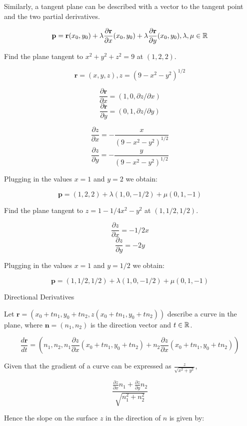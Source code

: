 \documentclass[a4paper,10pt]{article}
\begin{document}
Similarly, a tangent plane can be described with a vector to the tangent point
and the two partial derivatives.

\[ \mathbf{p} = \mathbf{r}(x_0, y_0)
+ \lambda \frac{\partial \mathbf{r}}{\partial x}(x_0, y_0)
+ \lambda \frac{\partial \mathbf{r}}{\partial y}(x_0, y_0)
, \lambda, \mu \in \mathbb{R} \]

\begin{ex}
	Find the plane tangent to $x^2 + y^2 + z^2 = 9$ at $(1,2,2)$.

	\[ \mathbf{r} = (x,y,z), z = (9 - x^2 - y^2)^{1/2} \]

	\[ \frac{\partial \mathbf{r}}{\partial x} = (1, 0, \partial z /
	\partial x) \]
	\[ \frac{\partial \mathbf{r}}{\partial y} = (0, 1, \partial z /
	\partial y) \]

	\[ \frac{\partial z}{\partial x} = - \frac{x}{(9-x^2-y^2)^{1/2}} \]
	\[ \frac{\partial z}{\partial y} = - \frac{y}{(9-x^2-y^2)^{1/2}} \]

	Plugging in the values $x=1$ and $y=2$ we obtain:

	\[ \mathbf{p} = (1,2,2) + \lambda (1, 0, -1/2) + \mu (0, 1, -1) \]
\end{ex}

\begin{ex}
	Find the plane tangent to $z = 1 - 1/4 x^2 - y^2$ at $(1,1/2,1/2)$.

	\[ \frac{\partial z}{\partial x} = -1/2 x \]
	\[ \frac{\partial z}{\partial y} = -2y \]

	Plugging in the values $x=1$ and $y=1/2$ we obtain:

	\[ \mathbf{p} = (1,1/2,1/2) + \lambda (1, 0, -1/2) + \mu (0, 1, -1) \]
\end{ex}

Directional Derivatives

Let $\mathbf{r} = \left(x_0 + tn_1, y_0 + tn_2, z(x_0 + tn_1, y_0 +
tn_2)\right)$ describe a curve in the plane, where $\mathbf{n} = (n_1, n_2)$ is
the direction vector and $t \in \mathbb{R}$.

\[ \frac{d\mathbf{r}}{dt} = \left(n_1, n_2, n_1 \frac{\partial z}{\partial x}
(x_0 + tn_1, y_0 + tn_2) + n_2 \frac{\partial z}{\partial x} (x_0 + tn_1, y_0 +
tn_2)\right) \]

Given that the gradient of a curve can be expressed as $\frac{z}{\sqrt{x^2 +
y^2}}$,

\[ \frac{\frac{\partial z}{\partial x} n_1 + \frac{\partial z}{\partial y}
n_2}{\sqrt{n_1^2 + n_2^2}} \]

Hence the slope on the surface $z$ in the direction of $n$ is given by:
\end{document}

